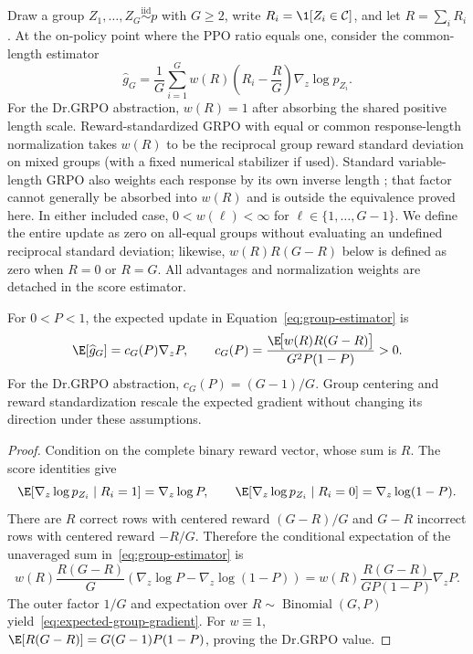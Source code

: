 Draw a group $Z_1,\ldots,Z_G\stackrel{\mathrm{iid}}{\sim}p$ with $G\ge2$,
write $R_i=\1[Z_i\in\mathcal C]$, and let $R=\sum_iR_i$. At the on-policy
point where the PPO ratio equals one, consider the common-length estimator
\begin{equation}
  \widehat g_G
  =\frac1G\sum_{i=1}^G
   w(R)\left(R_i-\frac{R}{G}\right)\nabla_z\log p_{Z_i}.
  \label{eq:group-estimator}
\end{equation}
For the Dr.GRPO abstraction, $w(R)=1$ after absorbing the shared positive
length scale. Reward-standardized GRPO with equal or common response-length
normalization takes $w(R)$ to be the reciprocal group reward standard
deviation on mixed groups (with a fixed numerical stabilizer if used).
Standard variable-length GRPO also weights each response by its own inverse
length \citep{shao2024deepseekmath,liu2025understanding}; that factor cannot
generally be absorbed into $w(R)$ and is outside the equivalence proved here.
In either included case, $0<w(\ell)<\infty$ for
$\ell\in\{1,\ldots,G-1\}$. We define the entire update as zero on all-equal
groups without evaluating an undefined reciprocal standard deviation;
likewise, $w(R)R(G-R)$ below is defined as zero when $R=0$ or $R=G$. All
advantages and normalization weights are detached in the score estimator.

\begin{lemma}
\enforcehalffinalproseline
\label{lem:grpo-mean}
For $0<P<1$, the expected update in Equation~\eqref{eq:group-estimator} is
\begin{equation}
  \E[\widehat g_G]
  =c_G(P)\nabla_z P,
  \qquad
  c_G(P)=
  \frac{\E\!\big[w(R)R(G-R)\big]}{G^2P(1-P)}>0.
  \label{eq:expected-group-gradient}
\end{equation}
For the Dr.GRPO abstraction, $c_G(P)=(G-1)/G$. Group centering and reward
standardization rescale the expected gradient without changing its direction
under these assumptions.
\end{lemma}

\begin{proof}
\enforcehalffinalproseline
Condition on the complete binary reward vector, whose sum is $R$. The score
identities give
\[
  \E[\nabla_z\log p_{Z_i}\mid R_i=1]=\nabla_z\log P,
  \qquad
  \E[\nabla_z\log p_{Z_i}\mid R_i=0]
  =\nabla_z\log(1-P).
\]
There are $R$ correct rows with centered reward $(G-R)/G$ and $G-R$
incorrect rows with centered reward $-R/G$. Therefore the conditional
expectation of the unaveraged sum in~\eqref{eq:group-estimator} is
\[
  w(R)\frac{R(G-R)}{G}
  \left(\nabla_z\log P-\nabla_z\log(1-P)\right)
  =w(R)\frac{R(G-R)}{GP(1-P)}\nabla_zP.
\]
The outer factor $1/G$ and expectation over
$R\sim\operatorname{Binomial}(G,P)$ yield~\eqref{eq:expected-group-gradient}.
For $w\equiv1$,
$\E[R(G-R)]=G(G-1)P(1-P)$, proving the Dr.GRPO value.
\end{proof}

